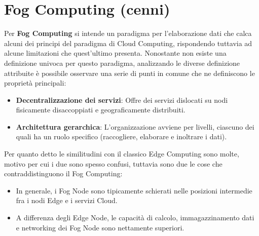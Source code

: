 \section{Fog Computing (cenni)}
Per \textbf{Fog Computing} si intende un paradigma per l’elaborazione dati che calca alcuni dei
principi del paradigma di Cloud Computing, rispondendo tuttavia ad alcune limitazioni che
quest’ultimo presenta. Nonostante non esiste una definizione univoca per questo paradigma, analizzando le diverse definizione attribuite è possibile osservare una serie di punti in comune che ne definiscono le proprietà principali:
\begin{itemize}
	\item \textbf{Decentralizzazione dei servizi}: Offre dei servizi dislocati su nodi
	fisicamente disaccoppiati e geograficamente distribuiti.
	\item \textbf{Architettura gerarchica}:	L'organizzazione avviene per livelli, ciascuno dei quali ha un ruolo specifico (raccogliere, elaborare e inoltrare i dati).
\end{itemize}
Per quanto detto le similitudini con il classico Edge Computing sono molte, motivo per cui i due sono spesso confusi, tuttavia sono due le cose che contraddistinguono il Fog Computing:
\begin{itemize}
	\item In generale, i Fog Node sono tipicamente schierati nelle
	posizioni intermedie fra i nodi Edge e i servizi Cloud.
	\item A differenza degli Edge Node, le capacità di calcolo, immagazzinamento dati e
	networking dei Fog Node sono nettamente superiori.
\end{itemize}

